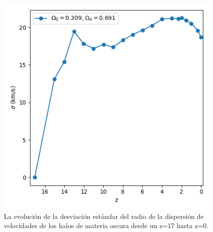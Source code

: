 \documentclass{beamer}
\begin{document}
\begin{frame}
\begin{columns}[t]
			\begin{column}{.5\textwidth}
				\begin{figure}
					\centering
					\includegraphics[scale=0.3]{RunCanonica/VelDisp_Std_RunCanonica.png}
					\caption{\footnotesize La evolución de la desviación estándar del radio de la dispersión de velocidades de los halos de materia oscura desde un z=17 hasta z=0.}
					\label{fig:Canon-VelDispStd}
				\end{figure}
			\end{column}
		\end{columns}

	\end{frame}	


\end{document}
